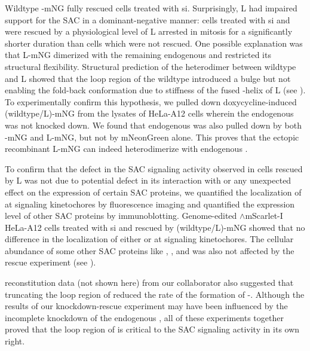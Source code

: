 Wildtype -mNG fully rescued cells treated with si. Surprisingly, \textDelta{}L had impaired support for the SAC in a dominant-negative manner: cells treated with si and were rescued by a physiological level of \textDelta{}L arrested in mitosis for a significantly shorter duration than cells which were not rescued. One possible explanation was that \textDelta{}L-mNG dimerized with the remaining endogenous  and restricted its structural flexibility. Structural prediction of the heterodimer between wildtype  and \textDelta{}L showed that the loop region of the wildtype  introduced a bulge but not enabling the fold-back conformation due to stiffness of the fused \textalpha{}-helix of \textDelta{}L (see ). To experimentally confirm this hypothesis, we pulled down doxycycline-induced (wildtype/\textDelta{}L)-mNG from the lysates of HeLa-A12 cells wherein the endogenous  was not knocked down. We found that endogenous  was also pulled down by both -mNG and \textDelta{}L-mNG, but not by mNeonGreen alone. This proves that the ectopic recombinant \textDelta{}L-mNG can indeed heterodimerize with endogenous .

To confirm that the defect in the SAC signaling activity observed in cells rescued by \textDelta{}L was not due to potential defect in its interaction with  or any unexpected effect on the expression of certain SAC proteins, we quantified the localization of  at signaling kinetochores by fluorescence imaging and quantified the expression level of other SAC proteins by immunoblotting. Genome-edited $\wedge$mScarlet-I HeLa-A12 cells treated with si and rescued by (wildtype/\textDelta{}L)-mNG showed that no difference in the localization of either  or  at signaling kinetochores. The cellular abundance of some other SAC proteins like , , and  was also not affected by the rescue experiment (see ).

 reconstitution data (not shown here) from our collaborator also suggested that truncating the loop region of  reduced the rate of the formation of -. Although the results of our knockdown-rescue experiment may have been influenced by the incomplete knockdown of the endogenous , all of these experiments together proved that the loop region of  is critical to the SAC signaling activity in its own right.